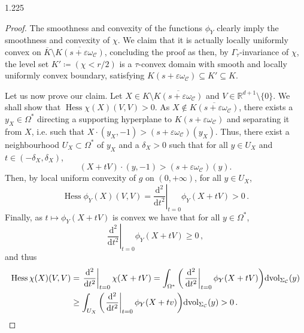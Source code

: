 \documentclass[reqno, a4paper]{amsart}
\numberwithin{equation}{section}
\numberwithin{figure}{section}
\theoremstyle{definition}
\theoremstyle{remark}
\newcommand{\R}{\mathbb{R}} %
\newcommand{\dif}{\mathrm{d}} %
\DeclareMathOperator{\Hess}{Hess} %
\newcommand{\C}{\mathcal{C}} %
\renewcommand{\S}{\Sigma_\C} %
\newcommand{\dvol}{\dif \mathrm{vol}} %
\newcommand{\vp}[1]{{\left( {#1} \right)}} %
\begin{document}
\begin{spacing}{1.225}
\begin{proof}
The smoothness and convexity of the functions $\phi_Y$ clearly imply the smoothness and convexity of $\chi$. We claim that it is actually locally uniformly convex on $\overline{K} \setminus \overline{K(s+\varepsilon \omega_\C)}$, concluding the proof as then, by $\Gamma_\tau$-invariance of $\chi$, the level set $K' \coloneqq (\chi < r/2)$ is a $\tau$-convex domain with smooth and locally uniformly convex boundary, satisfying $K(s+\varepsilon \omega_\C) \subseteq K' \subseteq K$. 

Let us now prove our claim. Let $X \in K \setminus \overline{K(s+\varepsilon \omega_\C)}$ and $V \in \R^{d+1}\setminus\{0\}$. We shall show that $\Hess \chi(X)(V,V)>0$. As $X \notin \overline{K(s+\varepsilon \omega_\C)}$, there exists a $y_X \in \Omega^*$ directing a supporting hyperplane to $K(s+\varepsilon \omega_\C)$ and separating it from $X$, i.e. such that $X\cdot(y_X,-1) > (s+\varepsilon\omega_\C)(y_X)$. Thus, there exist a neighbourhood $U_X \subset \Omega^*$ of $y_X$ and a $\delta_X >0$ such that for all $y\in U_X$ and $t\in (-\delta_X,\delta_X)$,
\begin{equation*}
 (X+tV)\cdot(y,-1) > (s+\varepsilon\omega_\C)(y). 
\end{equation*}
Then, by local uniform convexity of $g$ on $(0,+\infty)$, for all $y\in U_X$,
\begin{equation*}
 \Hess \phi_Y (X) (V,V) = \left. \frac{\dif^2}{\dif t^2}\right\vert_{t=0} \phi_Y(X + tV)>0 \, . 
\end{equation*}
Finally, as $t\mapsto \phi_Y(X+tV)$ is convex we have that for all $y\in \Omega^*$,
\begin{equation*}
 \left. \frac{\dif^2}{\dif t^2}\right\vert_{t=0} \phi_Y(X+tV)\geq 0 \, ,
\end{equation*}
and thus
\begin{align*}
 \Hess \chi (X) (V,V) & = \left. \frac{\dif^2}{\dif t^2}\right\vert_{t=0} \chi(X + tV) = \int_{\Omega^*}\vp{\left. \frac{\dif^2}{\dif t^2}\right\vert_{t=0}\phi_Y(X+tV)}\dvol_{\S}(y) \\
 & \geq \int_{U_X} \vp{ \left. \frac{\dif^2}{\dif t^2}\right\vert_{t=0}\phi_Y(X+tv)} \dvol_{\S}(y) > 0 \, . \qedhere
\end{align*}
\end{proof}



\end{spacing}



\end{document}
